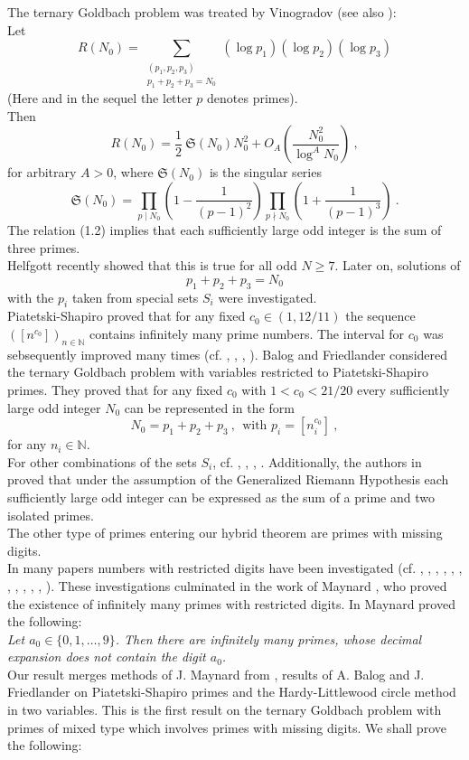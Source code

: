 \documentclass{amsart}
\numberwithin{equation}{subsection}
\begin{document}
The ternary Goldbach problem was treated by Vinogradov \cite{vino} (see also \cite{rasvino}):\\
Let
\[
R(N_0)=\sum_{\substack{(p_1,p_2,p_3)\\ p_1+p_2+p_3=N_0}} (\log p_1)(\log p_2)(\log p_3) \tag{1.1}
\]
(Here and in the sequel the letter $p$ denotes primes).\\
Then
\[
R(N_0)=\frac{1}{2}\:\mathfrak{S}(N_0)N_0^2+O_A\left(\frac{N_0^2}{\log^A N_0}\right)\:, \tag{1.2}
\]
for arbitrary $A>0$, where  $\mathfrak{S}(N_0)$ is the singular series
\[
\mathfrak{S}(N_0)=\prod_{p\mid N_0}\left(1-\frac{1}{(p-1)^2}\right)\prod_{p\nmid N_0}\left(1+\frac{1}{(p-1)^3}\right)\:. \tag{1.3}
\]
The relation (1.2) implies that each sufficiently large odd integer is the sum of three primes.\\
Helfgott \cite{helfgott} recently showed that this is true for all odd $N\geq 7$. Later on, solutions of
$$p_1+p_2+p_3=N_0$$
with the $p_i$ taken from special sets $S_i$ were investigated.\\
Piatetski-Shapiro \cite{Piatetski} proved that for any fixed $c_0\in(1,12/11)$ the sequence $([n^{c_0}])_{n\in\mathbb{N}}$ contains infinitely many prime numbers. The interval for $c_0$ was sebsequently improved many times (cf. \cite{Deshouillers}, \cite{Heath-Brown}, \cite{Kolenski},  \cite{Rivat}).
Balog and Friedlander \cite{balog} considered the ternary Goldbach problem with variables restricted to Piatetski-Shapiro primes. They proved that for any fixed $c_0$ with $1<c_0<21/20$ every sufficiently large odd integer $N_0$ can be  represented in the form 
$$N_0=p_1+p_2+p_3\:, \ \ \text{with $p_i=[n_i^{c_0}]$}\:,$$
for any $n_i\in\mathbb{N}$.\\
For other combinations of the sets $S_i$, cf. \cite{balog}, \cite{jia}, \cite{Kumchev}, \cite{Teravainen}. Additionally, the authors in \cite{maier_rassias_vinogradov} proved that under the assumption of the Generalized Riemann Hypothesis each sufficiently large odd integer can be expressed as the sum of a prime and two isolated primes.\\
The other type of primes entering our hybrid theorem are primes with missing digits.\\
In many papers numbers with restricted digits have been investigated (cf. \cite{Banks1}, \cite{Banks2}, \cite{Bourgain}, \cite{Dartyge1}, \cite{Dimitrov1},  \cite{Dimitrov2},  \cite{Dartyge2}, \cite{Drmota}, \cite{Erdos1}, \cite{Erdos2}, \cite{Konyagin}, \cite{Mauduit}). These investigations culminated in the work of Maynard \cite{maynard}, who proved the existence of infinitely many primes with restricted digits. In \cite{maynard} Maynard proved the following:\\
\textit{Let $a_0\in\{0,1,\ldots,9 \}$. Then there are infinitely many primes, whose decimal expansion does not contain the digit $a_0$.}\\
Our result merges methods of J. Maynard from \cite{maynard}, results of A. Balog and J. Friedlander on Piatetski-Shapiro primes \cite{balog} and the Hardy-Littlewood circle method in two variables. This is the first result on the ternary Goldbach problem with primes of mixed type which involves primes with missing digits. We shall prove the following:
\end{document}
